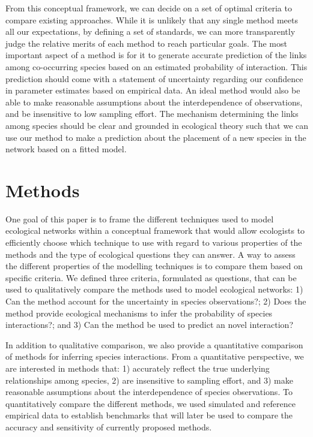 From this conceptual framework, we can decide on a set of optimal criteria to
compare existing approaches. While it is unlikely that any single method meets
all our expectations, by defining a set of standards, we can more transparently
judge the relative merits of each method to reach particular goals. The most
important aspect of a method is for it to generate accurate prediction of the
links among co-occurring species based on an estimated probability of
interaction. This prediction should come with a statement of uncertainty
regarding our confidence in parameter estimates based on empirical data. An
ideal method would also be able to make reasonable assumptions about the
interdependence of observations, and be insensitive to low sampling effort. The
mechanism determining the links among species should be clear and grounded in
ecological theory such that we can use our method to make a prediction about the
placement of a new species in the network based on a fitted model.

\section*{Methods}\label{methods}

One goal of this paper is to frame the different techniques used to model
ecological networks within a conceptual framework that would allow ecologists to
efficiently choose which technique to use with regard to various properties of
the methods and the type of ecological questions they can answer. A way to
assess the different properties of the modelling techniques is to compare them
based on specific criteria. We defined three criteria, formulated as questions,
that can be used to qualitatively compare the methods used to model ecological
networks: 1) Can the method account for the uncertainty in species
observations?; 2) Does the method provide ecological mechanisms to infer the
probability of species interactions?; and 3) Can the method be used to predict
an novel interaction?

In addition to qualitative comparison, we also provide a quantitative comparison
of methods for inferring species interactions. From a quantitative perspective,
we are interested in methods that: 1) accurately reflect the true underlying
relationships among species, 2) are insensitive to sampling effort, and 3) make
reasonable assumptions about the interdependence of species observations. To
quantitatively compare the different methods, we used simulated and reference
empirical data to establish benchmarks that will later be used to compare the
accuracy and sensitivity of currently proposed methods.

